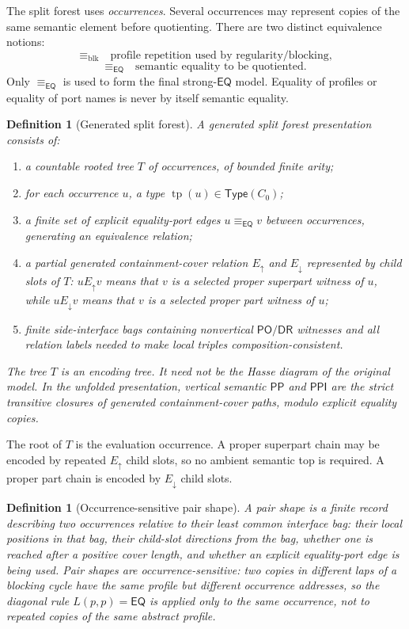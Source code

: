 \documentclass[11pt]{article}
\newtheorem{definition}[theorem]{Definition}
\newcommand{\EQ}{\mathsf{EQ}}
\newcommand{\PP}{\mathsf{PP}}
\newcommand{\PPI}{\mathsf{PPI}}
\newcommand{\PO}{\mathsf{PO}}
\newcommand{\DR}{\mathsf{DR}}
\newcommand{\tp}{\operatorname{tp}}
\begin{document}
The split forest uses \emph{occurrences}.  Several occurrences may represent copies of the same semantic element before quotienting.  There are two distinct equivalence notions:
\[
  \equiv_{\mathrm{blk}} \quad\text{profile repetition used by regularity/blocking,}
\]
\[
  \equiv_{\EQ} \quad\text{semantic equality to be quotiented.}
\]
Only $\equiv_{\EQ}$ is used to form the final strong-$\EQ$ model.  Equality of profiles or equality of port names is never by itself semantic equality.

\begin{definition}[Generated split forest]
A generated split forest presentation consists of:
\begin{enumerate}[label=(S\arabic*)]
\item a countable rooted tree $T$ of occurrences, of bounded finite arity;
\item for each occurrence $u$, a type $\tp(u)\in\mathsf{Type}(C_0)$;
\item a finite set of explicit equality-port edges $u\equiv_{\EQ}v$ between occurrences, generating an equivalence relation;
\item a partial generated containment-cover relation $E_\uparrow$ and $E_\downarrow$ represented by child slots of $T$:
      $uE_\uparrow v$ means that $v$ is a selected proper superpart witness of $u$, while $uE_\downarrow v$ means that $v$ is a selected proper part witness of $u$;
\item finite side-interface bags containing nonvertical $\PO/\DR$ witnesses and all relation labels needed to make local triples composition-consistent.
\end{enumerate}
The tree $T$ is an encoding tree.  It need not be the Hasse diagram of the original model.  In the unfolded presentation, vertical semantic $\PP$ and $\PPI$ are the strict transitive closures of generated containment-cover paths, modulo explicit equality copies.
\end{definition}

The root of $T$ is the evaluation occurrence.  A proper superpart chain may be encoded by repeated $E_\uparrow$ child slots, so no ambient semantic top is required.  A proper part chain is encoded by $E_\downarrow$ child slots.

\begin{definition}[Occurrence-sensitive pair shape]
A pair shape is a finite record describing two occurrences relative to their least common interface bag: their local positions in that bag, their child-slot directions from the bag, whether one is reached after a positive cover length, and whether an explicit equality-port edge is being used.  Pair shapes are occurrence-sensitive: two copies in different laps of a blocking cycle have the same profile but different occurrence addresses, so the diagonal rule $L(p,p)=\EQ$ is applied only to the same occurrence, not to repeated copies of the same abstract profile.
\end{definition}
\end{document}
